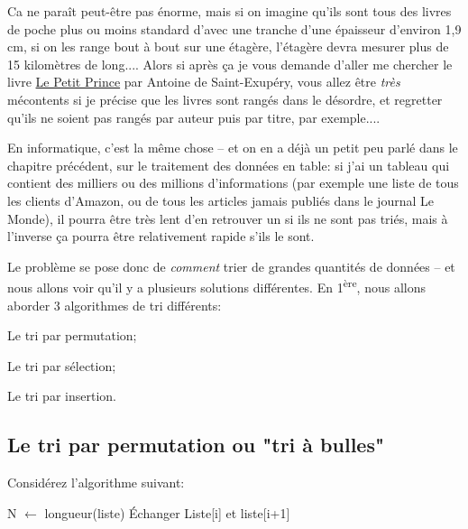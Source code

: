 \documentclass[12pt]{article}
\begin{document}
	Ca ne paraît peut-être pas énorme, mais si on imagine qu'ils sont tous des livres de poche plus ou moins standard d'avec une tranche d'une épaisseur d'environ 1,9 cm, si on les range bout à bout sur une étagère, l'étagère devra mesurer plus de 15 kilomètres de long.... Alors si après ça je vous demande d'aller me chercher le livre \uline{Le Petit Prince} par Antoine de Saint-Exupéry, vous allez être \textit{très} mécontents si je précise que les livres sont rangés dans le désordre, et regretter qu'ils ne soient pas rangés par auteur puis par titre, par exemple.... 
	
	En informatique, c'est la même chose -- et on en a déjà un petit peu parlé dans le chapitre précédent, sur le traitement des données en table: si j'ai un tableau qui contient des milliers ou des millions d'informations (par exemple une liste de tous les clients d'Amazon, ou de tous les articles jamais publiés dans le journal Le Monde), il pourra être très lent d'en retrouver un si ils ne sont pas triés, mais à l'inverse ça pourra être relativement rapide s'ils le sont.
	
	Le problème se pose donc de \textit{comment} trier de grandes quantités de données -- et nous allons voir qu'il y a plusieurs solutions différentes. En 1\textsuperscript{ère}, nous allons aborder 3 algorithmes de tri différents:
	\begin{alphenum}
		\item Le tri par permutation;
		\item Le tri par sélection;
		\item Le tri par insertion.
	\end{alphenum}
	
	\subsection{Le tri par permutation ou "tri à bulles"}
	Considérez l'algorithme suivant:
	\begin{algorithmic}[1]
		\State N $\leftarrow$ longueur(liste)
		\State Échanger Liste[i] et liste[i+1]
		\EndIf
		\EndFor
		\State{}
		\EndFunction
	\end{algorithmic}
	
\end{document}
